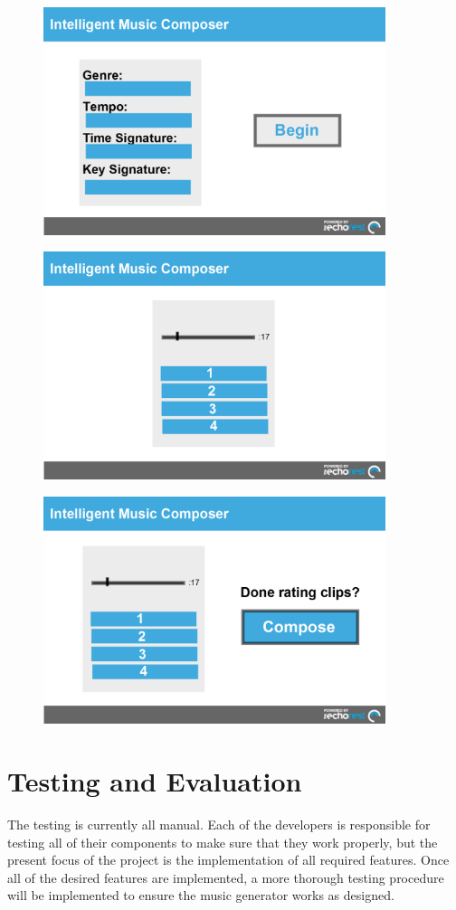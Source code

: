 \documentclass{article}
\begin{document}
\begin{figure}[H]
\centerline{\includegraphics[width=10cm]{begin.png}}
\end{figure}

\begin{figure}[H]
\centerline{\includegraphics[width=10cm]{pref.png}}
\end{figure}

\begin{figure}[H]
\centerline{\includegraphics[width=10cm]{compose.png}}
\end{figure}

\section{Testing and Evaluation}
The testing is currently all manual. Each of the developers is responsible for testing all of their
components to make sure that they work properly, but the present focus of the project is the 
implementation of all required features. Once all of the desired features are implemented, a
more thorough testing procedure will be implemented to ensure the music generator works as designed.
\end{document}
